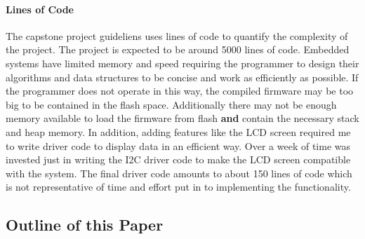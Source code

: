 \documentclass[acmlarge,screen]{acmart}
\begin{document}
	\paragraph{Lines of Code} The capstone project guideliens uses lines of code to quantify the complexity of the project. The project is expected to be around 5000 lines of code. Embedded systems have limited memory and speed requiring the programmer to design their algorithms and data structures to be concise and work as efficiently as possible. If the programmer does not operate in this way, the compiled firmware may be too big to be contained in the flash space. Additionally there may not be enough memory available to load the firmware from flash \textbf{and} contain the necessary stack and heap memory. In addition, adding features like the LCD screen required me to write driver code to display data in an efficient way. Over a week of time was invested just in writing the I2C driver code to make the LCD screen compatible with the system. The final driver code amounts to about 150 lines of code which is not representative of time and effort put in to implementing the functionality.
	
	
\subsection{Outline of this Paper}
\end{document}
